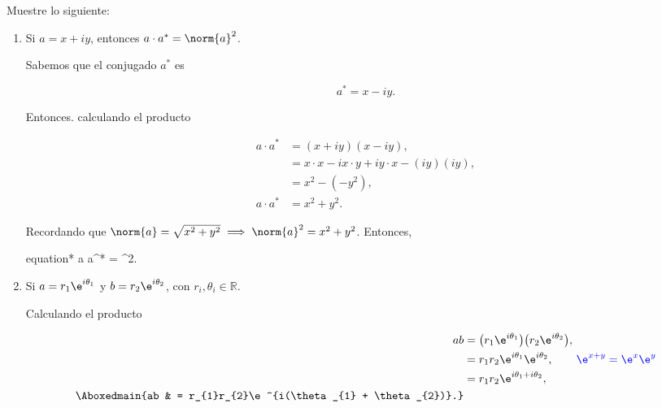 \documentclass[./../main.tex]{subfiles}
\begin{document}
\begin{problema}[15]
	Muestre lo siguiente:

	\begin{enumerate}
		\item Si \(a = x + iy\), entonces \(a\cdot a^{*} = \norm{a}^{2}\).

		      \startsolution

		      Sabemos que el conjugado \(a^{*}\) es

		      \begin{equation*}
			      a^{*} = x - iy.
		      \end{equation*}

		      Entonces. calculando el producto

		      \begin{align*}
			      a \cdot a^{*} & = (x + iy)(x - iy),                               \\
			                    & = x \cdot x - ix \cdot y + iy \cdot x - (iy)(iy), \\
			                    & = x^{2} - (-y^{2}),                               \\
			      a \cdot a^{*} & = x^{2} + y^{2}.
		      \end{align*}

		      Recordando que \(\norm{a} = \sqrt{x^{2} + y^{2}} \implies \norm{a}^{2} = x^{2} + y^{2}\). Entonces,

		      \begin{empheq}[box=\resultbox]{equation*}
			      a \cdot a^{*} = ^{2}.
		      \end{empheq}

		\item Si \(a = r_{1}\e^{i\theta_{1}}\) y \(b = r_{2}\e^{i\theta_{2}}\), con \(r_{i},\theta_{i}\in\mathbb{R}\).

		      \startsolution

		      Calculando el producto

		      \begin{align*}
			      ab             & = \bigl(r_{1}\e^{i\theta_{1}}\bigr)\bigl(r_{2}\e^{i\theta_{2}}\bigr),                           \\
			                     & = r_{1}r_{2}\e^{i\theta_{1}}\e^{i\theta_{2}},\qquad \mathcolor{blue}{\e^{x + y} = \e^{x}\e^{y}} \\
			                     & = r_{1}r_{2}\e^{i\theta_{1} + i\theta_{2}},                                                     \\
			      \Aboxedmain{ab & = r_{1}r_{2}\e^{i(\theta_{1} + \theta_{2})}.}
		      \end{align*}


\end{enumerate}
\end{problema}
\end{document}
